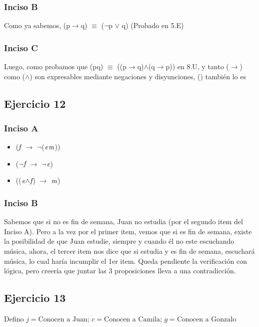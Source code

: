 		\subsubsection{Inciso B}
		Como ya sabemos, (p$\rightarrow$q) $\equiv$ ($\neg$p $\vee$ q)  (Probado en 5.E)
		
		\subsubsection{Inciso C}
		Luego, como probamos que (p\Iff q) $\equiv$ ((p$\rightarrow$q)$\wedge$(q$\rightarrow$p)) en 8.U, y tanto ($\rightarrow$) como ($\wedge$) son expresables mediante negaciones y disyunciones, (\Iff)  también lo es
	\subsection{Ejercicio 12}
		\subsubsection{Inciso A}
		\begin{itemize}
			\item ($\emph{f}$ $\rightarrow$ $\neg$($\emph{e}$\Iff $\emph{m}$))
			\item ($\neg$$\emph{f}$ $\rightarrow$ $\neg$$\emph{e}$)
			\item (($\emph{e}$$\wedge$$\emph{f}$) $\rightarrow$ $\emph{m}$)
		\end{itemize}
		\subsubsection{Inciso B}
		Sabemos que si no es fin de semana, Juan no estudia (por el segundo item del Inciso A). Pero a la vez por el primer item, vemos que si es fin de semana, existe la posibilidad de que Juan estudie, siempre y cuando él no este escuchando música, ahora, el tercer item nos dice que si estudia y es fin de semana, escuchará música, lo cual haría incumplir el 1er item.
		Queda pendiente la verificación con lógica, pero creería que juntar las 3 proposiciones lleva a una contradicción.
	
	\subsection{Ejercicio 13}
		Defino $j = \text{Conocen a Juan; } c = \text{Conocen a Camila; } g = \text{Conocen a Gonzalo}$ \\
		
